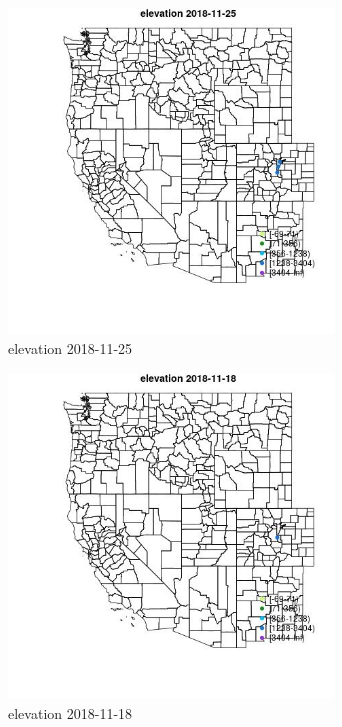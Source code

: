\begin{figure} 
\centering  
\includegraphics[width=0.77\textwidth]{Code_Outputs/Report_ML_input_PM25_Step4_part_e_de_duplicated_aveswNAs_MapObselevation2018-11-25.jpg} 
\caption{\label{fig:Report_ML_input_PM25_Step4_part_e_de_duplicated_aveswNAsMapObselevation2018-11-25}elevation 2018-11-25} 
\end{figure} 
 

\clearpage 

\begin{figure} 
\centering  
\includegraphics[width=0.77\textwidth]{Code_Outputs/Report_ML_input_PM25_Step4_part_e_de_duplicated_aveswNAs_MapObselevation2018-11-18.jpg} 
\caption{\label{fig:Report_ML_input_PM25_Step4_part_e_de_duplicated_aveswNAsMapObselevation2018-11-18}elevation 2018-11-18} 
\end{figure} 
 

